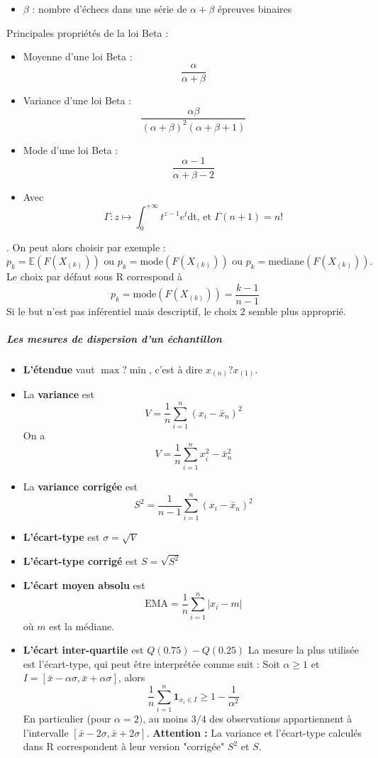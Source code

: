 \begin{itemize}
\begin{enumerate}
\begin{itemize}
{\begin{itemize}
\item $\beta$ : nombre d'échecs dans une série de $\alpha + \beta$ épreuves binaires
\end{itemize}
Principales propriétés de la loi Beta :
\begin{itemize}
\item Moyenne d'une loi Beta : 
$$\frac{\alpha}{\alpha + \beta}$$
\item Variance d'une loi Beta : 
$$ \frac{\alpha\beta}{(\alpha + \beta)^{2}(\alpha + \beta+1)}$$
\item Mode d'une loi Beta : 
$$\frac{\alpha-1}{\alpha + \beta-2}$$
\item Avec 
$$\Gamma : z \mapsto \int_{0}^{+\infty} t^{z-1}e^{t}\textrm{dt, et } \Gamma(n+1) = n! $$
\end{itemize}
}. On peut alors choisir par exemple :
$$p_{k} = \mathbb{E}(F(X_{(k)})) \textrm{ ou } p_{k} = \textrm{mode}(F(X_{(k)}))\textrm{ ou } p_{k} = \textrm{mediane}(F(X_{(k)})). $$
Le choix par défaut sous \textrm{R} correspond à 
$$p_{k} = \textrm{mode}(F(X_{(k)})) = \frac{k-1}{n-1}$$
Si le but n'est pas inférentiel mais descriptif, le choix 2 semble plus approprié.
\end{itemize}
\end{enumerate} 
\end{itemize}
\subparagraph{Les mesures de dispersion d'un échantillon}
\begin{itemize}

\item \textbf{L'étendue }vaut $\max ? \min$, c'est à dire $x_{(n)} ? x_{(1)}$.
\item La \textbf{variance} est
$$V = \frac{1}{n} \sum_{i=1}^{n} (x_{i} - \bar{x}_{n})^{2}$$
On a 
$$V = \frac{1}{n} \sum_{i=1}^{n} x_{i}^{2} - \bar{x}_{n}^{2}$$
\item La \textbf{variance corrigée} est
$$S^{2} = \frac{1}{n-1}\sum_{i=1}^{n} (x_{i}-\bar{x}_{n})^{2}$$
\item \textbf{L'écart-type} est $\sigma = \sqrt{V}$
\item \textbf{L'écart-type corrigé} est $S=\sqrt{S^{2}}$
\item \textbf{L'écart moyen absolu} est 
$$\textrm{EMA} = \frac{1}{n}\sum_{i=1}^{n}|x_{i}-m|$$
où $m$ est la médiane.
\item \textbf{L'écart inter-quartile} est $Q(0.75) - Q(0.25)$\newline
La mesure la plus utilisée est l'écart-type, qui peut être interprétée comme suit :\newline
Soit $\alpha \geq 1$ et $\mathit{I} =  [\bar{x}-\alpha\sigma,\bar{x}+\alpha\sigma]$, alors 
$$\frac{1}{n}\sum_{i=1}^{n}\mathbf{1}_{x_{i}\in\mathit{I}} \geq 1 - \frac{1}{\alpha^{2}}$$
En particulier (pour $\alpha = 2)$, au moins $3/4$ des observations appartiennent à l'intervalle $[\bar{x}-2\sigma,\bar{x}+2\sigma]$.\newline
\textbf{Attention :} La variance et l'écart-type calculés dans R correspondent à leur
version "corrigée" $S^{2}$ et $S$.
\end{itemize}
